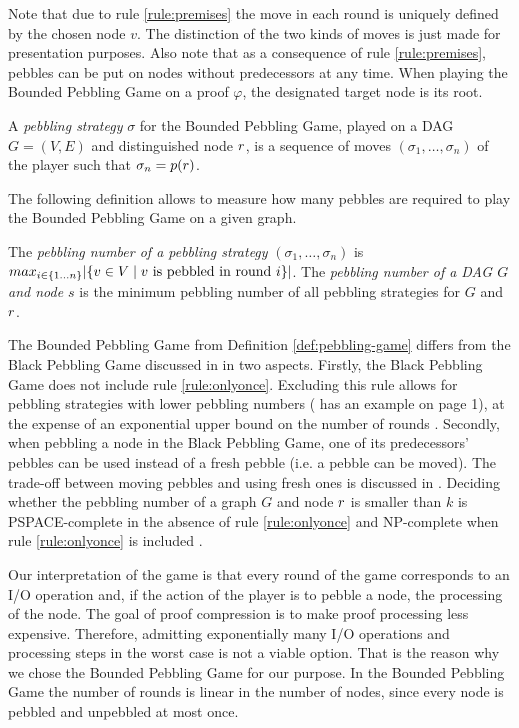 Note that due to rule \ref{rule:premises} the move in each round is uniquely defined by the chosen node $v$.
The distinction of the two kinds of moves is just made for presentation purposes.
Also note that as a consequence of rule \ref{rule:premises}, pebbles can be put on nodes without predecessors at any time.
When playing the Bounded Pebbling Game on a proof $\varphi$, the designated target node is its root.

\begin{definition}[Strategy]
\label{def:strategy}
A \emph{pebbling strategy} $\sigma$ for the Bounded Pebbling Game, played on a DAG $G = (V,E)$ and distinguished node $r$, is a sequence of moves $(\sigma_1,\ldots,\sigma_n)$ of the player such that $\sigma_n = p(r)$.
\end{definition}

The following definition allows to measure how many pebbles are required to play the Bounded Pebbling Game on a given graph.

\begin{definition}
The \emph{pebbling number of a pebbling strategy} $(\sigma_1,\ldots,\sigma_n)$ is 
$ max_{i \scriptstyle \in \{1\ldots n\} \displaystyle}|\{ v \in V \mid v \text{ is pebbled in round } i\}| $.
The \emph{pebbling number of a DAG $G$ and node $s$} is the minimum pebbling number of all pebbling strategies for $G$ and $r$.
\end{definition}

The Bounded Pebbling Game from Definition \ref{def:pebbling-game} differs from the Black Pebbling Game discussed in \cite{Hertel2007,Pippenger1982} in two aspects. 
Firstly, the Black Pebbling Game does not include rule \ref{rule:onlyonce}. 
Excluding this rule allows for pebbling strategies with lower pebbling numbers (\cite{Sethi1975} has an example on page 1), at the expense of an exponential upper bound on the number of rounds \cite{EmdeBoas1979}.
Secondly, when pebbling a node in the Black Pebbling Game, one of its predecessors' pebbles can be used instead of a fresh pebble (i.e. a pebble can be moved). 
The trade-off between moving pebbles and using fresh ones is discussed in \cite{EmdeBoas1979}. 
Deciding whether the pebbling number of a graph $G$ and node $r$ is smaller than $k$ is PSPACE-complete in the absence of rule \ref{rule:onlyonce} \cite{Gilbert1980} and NP-complete when rule \ref{rule:onlyonce} is included \cite{Sethi1975}.

Our interpretation of the game is that every round of the game corresponds to an I/O operation and, if the action of the player is to pebble a node, the processing of the node.
The goal of proof compression is to make proof processing less expensive.
Therefore, admitting exponentially many I/O operations and processing steps in the worst case is not a viable option.
That is the reason why we chose the Bounded Pebbling Game for our purpose.
In the Bounded Pebbling Game the number of rounds is linear in the number of nodes, since every node is pebbled and unpebbled at most once.


